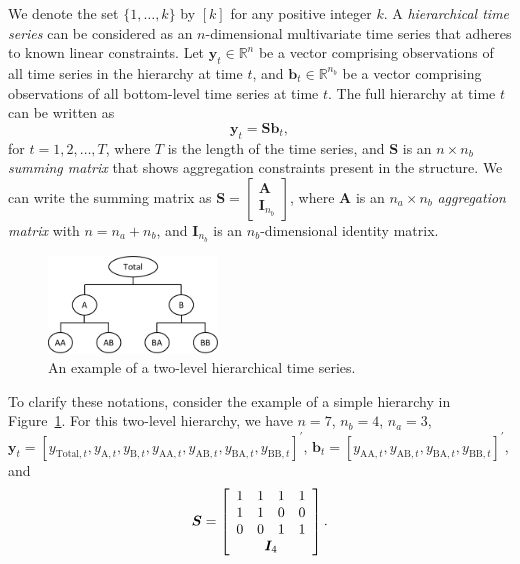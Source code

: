 \documentclass[
  12pt,
  11pt]{article}
\begin{document}
We denote the set \(\{1,\ldots,k\}\) by \([k]\) for any positive integer
\(k\). A \emph{hierarchical time series} can be considered as an
\(n\)-dimensional multivariate time series that adheres to known linear
constraints. Let \(\bm{y}_t \in \mathbb{R}^n\) be a vector comprising
observations of all time series in the hierarchy at time \(t\), and
\(\bm{b}_t \in \mathbb{R}^{n_b}\) be a vector comprising observations of
all bottom-level time series at time \(t\). The full hierarchy at time
\(t\) can be written as \[
\bm{y}_t = \bm{S}\bm{b}_t,
\] for \(t=1,2,\ldots,T\), where \(T\) is the length of the time series,
and \(\bm{S}\) is an \(n \times n_b\) \emph{summing matrix} that shows
aggregation constraints present in the structure. We can write the
summing matrix as
\(\bm{S} = \left[\begin{array}{c}\bm{A} \\ \bm{I}_{n_b}\end{array}\right]\),
where \(\bm{A}\) is an \(n_a \times n_b\) \emph{aggregation matrix} with
\(n = n_a + n_b\), and \(\bm{I}_{n_b}\) is an \(n_b\)-dimensional
identity matrix.

\begin{figure}

{\centering \includegraphics[width=0.4\textwidth,height=\textheight]{figs/hts_example.pdf}

}

\caption{\label{fig-hts}An example of a two-level hierarchical time
series.}

\end{figure}

To clarify these notations, consider the example of a simple hierarchy
in Figure~\ref{fig-hts}. For this two-level hierarchy, we have
\(n = 7\), \(n_b = 4\), \(n_a = 3\),
\(\bm{y}_t = [y_{\text{Total},t}, y_{\text{A},t}, y_{\text{B},t}, y_{\text{AA},t}, y_{\text{AB},t}, y_{\text{BA},t}, y_{\text{BB},t}]^{\prime}\),
\(\bm{b}_t = [y_{\text{AA},t}, y_{\text{AB},t}, y_{\text{BA},t}, y_{\text{BB},t}]^{\prime}\),
and \[
\bm{S} = \left[
\begin{array}{cccc}
1 & 1 & 1 & 1 \\
1 & 1 & 0 & 0 \\
0 & 0 & 1 & 1 \\
\multicolumn{4}{c}{\bm{I}_4}
\end{array}\right].
\]
\end{document}
